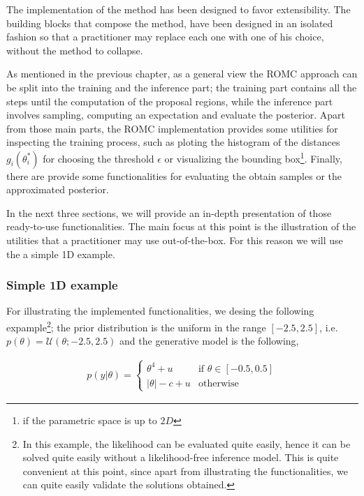 The implementation of the method has been designed to favor extensibility. The building blocks that compose the method, have been designed in an isolated fashion so that a practitioner may replace each one with one of his choice, without the method to collapse.

As mentioned in the previous chapter, as a general view the ROMC approach can be split into the training and the inference part; the training part contains all the steps until the computation of the proposal regions, while the inference part involves sampling, computing an expectation and evaluate the posterior. Apart from those main parts, the ROMC implementation provides some utilities for inspecting the training process, such as ploting the histogram of the distances $g_i(\theta_i^*)$ for choosing the threshold $\epsilon$ or visualizing the bounding box\footnote{if the parametric space is up to $2D$}. Finally, there are provide some functionalities for evaluating the obtain samples or the approximated posterior.

In the next three sections, we will provide an in-depth presentation of those ready-to-use functionalities. The main focus at this point is the illustration of the utilities that a practitioner may use out-of-the-box. For this reason we will use the a simple 1D example.

\subsubsection*{Simple 1D example}

For illustrating the implemented functionalities, we desing the following expample\footnote{In this example, the likelihood can be evaluated quite easily, hence it can be solved quite easily without a likelihood-free inference model. This is quite convenient at this point, since apart from illustrating the functionalities, we can quite easily validate the solutions obtained.}; the prior distribution is the uniform in the range $[-2.5, 2.5]$, i.e.\ $p(\theta) = \mathcal{U}(\theta;-2.5,2.5)$ and the generative model is the following,

\begin{gather} \label{eq:1D_example}
  p(y|\theta) = 
  \left\{
    \begin{array}{ll}
      \theta^4 + u & \mbox{if } \theta \in [-0.5, 0.5] \\
      |\theta| - c + u & \mbox{otherwise} 
    \end{array} \right.
\end{gather}

